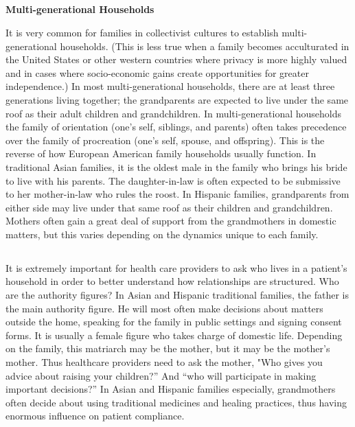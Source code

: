 \documentclass[12pt]{article}
\begin{document}
\begin{spacing}{1.5}
{			\subsection{}
			\textbf{Multi-generational Households}
			
			It is very common for families in collectivist cultures to establish multi-generational households. (This is less true when a family becomes acculturated in the United States or other western countries where privacy is more highly valued and in cases where socio-economic gains create opportunities for greater independence.) In most multi-generational households, there are at least three generations living together; the grandparents are expected to live under the same roof as their adult children and grandchildren. In multi-generational households the family of orientation (one's self, siblings, and parents) often takes precedence over the family of procreation (one's self, spouse, and offspring). This is the reverse of how European American family households usually function. In traditional Asian families, it is the oldest male in the family who brings his bride to live with his parents. The daughter-in-law is often expected to be submissive to her mother-in-law who rules the roost. In Hispanic families, grandparents from either side may live under that same roof as their children and grandchildren. Mothers often gain a great deal of support from the grandmothers in domestic matters, but this varies depending on the dynamics unique to each family.
			
			\subsection{}
			It is extremely important for health care providers to ask who lives in a patient's household in order to better understand how relationships are structured. Who are the authority figures? In Asian and Hispanic traditional families, the father is the main authority figure. He will most often make decisions about matters outside the home, speaking for the family in public settings and signing consent forms. It is usually a female figure who takes charge of domestic life. Depending on the family, this matriarch may be the mother, but it may be the mother's mother. Thus healthcare providers need to ask the mother, "Who gives you advice about raising your children?” And “who will participate in making important decisions?” In Asian and Hispanic families especially, grandmothers often decide about using traditional medicines and healing practices, thus having enormous influence on patient compliance.
			
}
\end{spacing}
\end{document}
